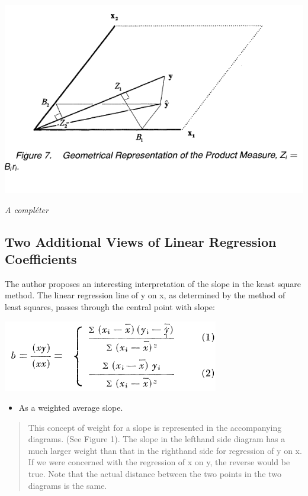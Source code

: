 \documentclass[
]{report}
\providecommand{\tightlist}{%
  \setlength{\itemsep}{0pt}\setlength{\parskip}{0pt}}
\begin{document}
\includegraphics{bring.PNG}

\emph{A compléter}

\hypertarget{two-additional-views-of-linear-regression-coefficients}{%
\subsection{Two Additional Views of Linear Regression Coefficients}\label{two-additional-views-of-linear-regression-coefficients}}

The author \citep{Cli} proposes an interesting interpretation of the slope in the keast square method. The linear regression line of y on x, as determined by the method of least squares, passes through the central point with slope:

\includegraphics{slope.PNG}

\begin{itemize}
\tightlist
\item
  As a weighted average slope.
\end{itemize}

\begin{quote}
This concept of weight for a slope is represented in the accompanying diagrams. (See Figure 1). The slope in the lefthand side diagram has a much larger weight than that in the righthand side for regression of y on x. If we were concerned with the regression of x on y, the reverse would be true. Note that the actual distance between the two points in the two diagrams is the same.
\end{quote}
\end{document}
